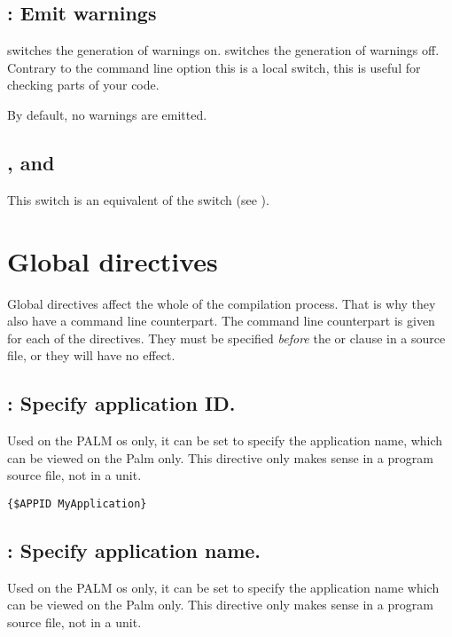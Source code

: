 \subsection{ : Emit warnings}

 switches the generation of warnings on.
 switches the generation of warnings off.
Contrary to the command line option  this
is a local switch, this is useful for checking parts of your code.

By default, no warnings are emitted.

\subsection{,  and }

This switch is an equivalent of the  switch
(see ).

\section{Global directives}
\label{se:GlobalSwitch}
Global directives affect the whole of the compilation process. That is why
they also have a command line counterpart. The command line counterpart is
given for each of the directives. They must be specified {\em before} the
 or  clause in a source file, or they will have no
effect.

\subsection{ : Specify application ID.}
Used on the PALM os only, it can be set to specify the application name,
which can be viewed on the Palm only. This directive only makes sense in a
program source file, not in a unit.

\begin{verbatim}
{$APPID MyApplication}
\end{verbatim}

\subsection{ : Specify application name.}
Used on the PALM os only, it can be set to specify the application name
which can be viewed on the Palm only. This directive only makes sense in a
program source file, not in a unit.

